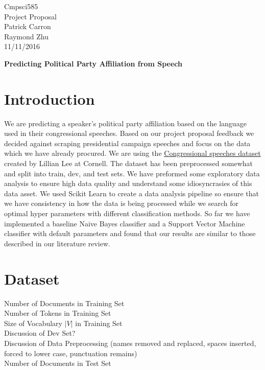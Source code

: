 \documentclass[a4paper, 11pt]{article}
\begin{document}
\noindent
Cmpsci585\\
Project Proposal\\
Patrick Carron \\
Raymond Zhu\\
11/11/2016 \\
\begin{center}

\textbf{Predicting Political Party Affiliation from Speech}
\end{center}
\section{Introduction}
We are predicting a speaker's political party affiliation based on the language used in their congressional speeches. Based on our project proposal feedback we decided against scraping presidential campaign speeches and focus on the data which we have already procured. We are using the \href{http://www.cs.cornell.edu/home/llee/data/convote.html}{Congressional speeches dataset} created by Lillian Lee at Cornell. The dataset has been preprocessed somewhat and split into train, dev, and test sets.  We have preformed some exploratory data analysis to ensure high data quality and understand some idiosyncrasies of this data asset. We used Scikit Learn to create a data analysis pipeline so ensure that we have consistency in how the data is being processed while we search for optimal hyper parameters with different classification methods. So far we have implemented a baseline Naive Bayes classifier and a Support Vector Machine classifier with default parameters and found that our results are similar to those described in our literature review.

\section{Dataset}
Number of Documents in Training Set\\
Number of Tokens in Training Set\\
Size of Vocabulary $|V|$ in Training Set\\
Discussion of Dev Set?\\
Discussion of Data Preprocessing (names removed and replaced, spaces inserted, forced to lower case, punctuation remains)\\
Number of Documents in Test Set\\
\end{document}
